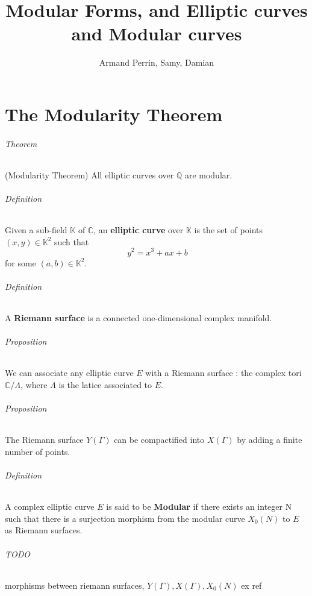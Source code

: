 \documentclass[letterpaper,10pt]{article}
\title{Modular Forms, and Elliptic curves and Modular curves}
\author{Armand Perrin, Samy, Damian}
\begin{document}
\maketitle%
\part{The Modularity Theorem}

\paragraph{ Theorem } (Modularity Theorem) All elliptic curves over $\mathbb{Q}$ are modular.


\paragraph{ Definition } Given a sub-field $\mathbb{K}$ of $\mathbb{C}$, an \textbf{elliptic curve} over $\mathbb{K}$ is the set of points $(x,y) \in \mathbb{K}^2$ such that 
\[\ y^2 = x^3 + ax + b \] for some $(a,b) \in \mathbb{K}^2$.

\paragraph{ Definition } A \textbf{Riemann surface} is a connected one-dimensional complex manifold.

\paragraph{Proposition} We can associate any elliptic curve $E$ with a Riemann surface : the complex tori $\mathbb{C}/\Lambda$, where $\Lambda$ 
is the latice associated to $E$.
\paragraph{Proposition} The Riemann surface $Y(\Gamma)$ can be compactified into $X(\Gamma)$ by adding a finite number of points.

\paragraph{Definition} A complex elliptic curve $E$ is said to be \textbf{Modular} if there exists an integer N such that there is a surjection morphism from the 
modular curve $X_0(N)$ to $E$ as Riemann surfaces.

\paragraph{TODO} morphisms between riemann surfaces, $Y(\Gamma),X(\Gamma),X_0(N)$
ex ref \cite{zhou}

\printbibliography %
\end{document}
